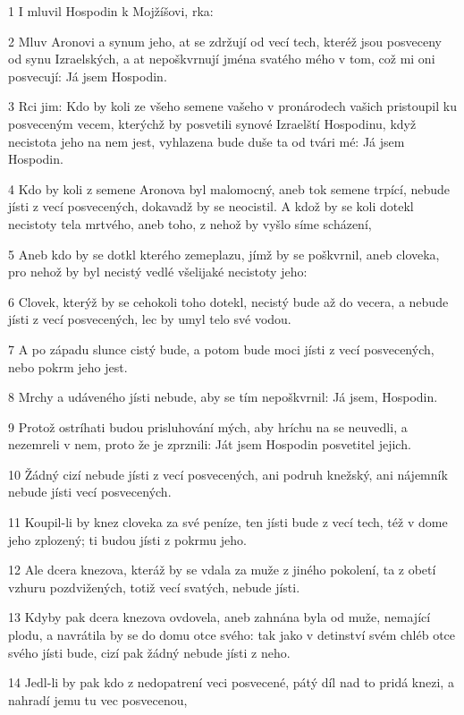 \par 1 I mluvil Hospodin k Mojžíšovi, rka:
\par 2 Mluv Aronovi a synum jeho, at se zdržují od vecí tech, kteréž jsou posveceny od synu Izraelských, a at nepoškvrnují jména svatého mého v tom, což mi oni posvecují: Já jsem Hospodin.
\par 3 Rci jim: Kdo by koli ze všeho semene vašeho v pronárodech vašich pristoupil ku posveceným vecem, kterýchž by posvetili synové Izraelští Hospodinu, když necistota jeho na nem jest, vyhlazena bude duše ta od tvári mé: Já jsem Hospodin.
\par 4 Kdo by koli z semene Aronova byl malomocný, aneb tok semene trpící, nebude jísti z vecí posvecených, dokavadž by se neocistil. A kdož by se koli dotekl necistoty tela mrtvého, aneb toho, z nehož by vyšlo síme scházení,
\par 5 Aneb kdo by se dotkl kterého zemeplazu, jímž by se poškvrnil, aneb cloveka, pro nehož by byl necistý vedlé všelijaké necistoty jeho:
\par 6 Clovek, kterýž by se cehokoli toho dotekl, necistý bude až do vecera, a nebude jísti z vecí posvecených, lec by umyl telo své vodou.
\par 7 A po západu slunce cistý bude, a potom bude moci jísti z vecí posvecených, nebo pokrm jeho jest.
\par 8 Mrchy a udáveného jísti nebude, aby se tím nepoškvrnil: Já jsem, Hospodin.
\par 9 Protož ostríhati budou prisluhování mých, aby hríchu na se neuvedli, a nezemreli v nem, proto že je zprznili: Ját jsem Hospodin posvetitel jejich.
\par 10 Žádný cizí nebude jísti z vecí posvecených, ani podruh knežský, ani nájemník nebude jísti vecí posvecených.
\par 11 Koupil-li by knez cloveka za své peníze, ten jísti bude z vecí tech, též v dome jeho zplozený; ti budou jísti z pokrmu jeho.
\par 12 Ale dcera knezova, kteráž by se vdala za muže z jiného pokolení, ta z obetí vzhuru pozdvižených, totiž vecí svatých, nebude jísti.
\par 13 Kdyby pak dcera knezova ovdovela, aneb zahnána byla od muže, nemající plodu, a navrátila by se do domu otce svého: tak jako v detinství svém chléb otce svého jísti bude, cizí pak žádný nebude jísti z neho.
\par 14 Jedl-li by pak kdo z nedopatrení veci posvecené, pátý díl nad to pridá knezi, a nahradí jemu tu vec posvecenou,

